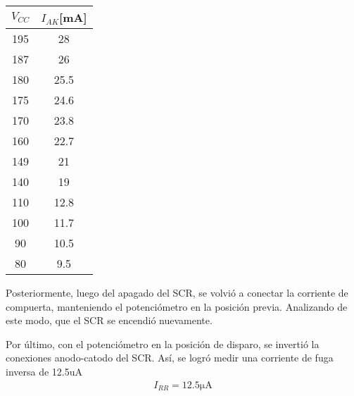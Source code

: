 \begin{minipage}{0.3\linewidth}
\begin{table}[H]
  \begin{center}
    \begin{tabular}{c|c}
      $V_{CC}$ &$I_{AK}$[mA]   \\
      \hline
      195   &28   \\
      187   &26  \\
      180   &25.5  \\
      175   &24.6  \\
      170   &23.8  \\
      160   &22.7  \\
      149   &21  \\
      140   &19  \\
      110   &12.8  \\
      100   &11.7  \\
      90    &10.5  \\
      80    &9.5  \\
    \end{tabular}
  \end{center} 
\end{table}
\end{minipage}
\begin{minipage}{0.7\linewidth}
  \centering
\end{minipage}
\par
Posteriormente, luego del apagado del SCR, se volvió a conectar la corriente de compuerta,
manteniendo el potenciómetro en la posición previa. Analizando de este modo, que el SCR 
se encendió nuevamente.
\par
Por último, con el potenciómetro en la posición de disparo, se invertió la conexiones 
anodo-catodo del SCR. Así, se logró medir una corriente de fuga inversa de 12.5uA
\begin{align}
  I_{RR} = 12.5\unit{\micro\ampere} 
\end{align}

